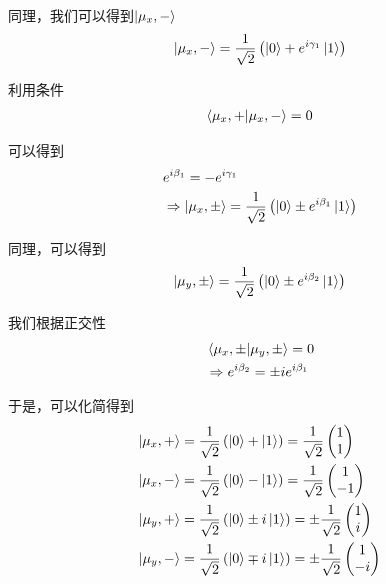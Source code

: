 \documentclass{article}
\begin{document}
同理，我们可以得到$\ket{\mu_x,-}$
\begin{align*}
    \ket{\mu_x,-}=\frac{1}{\sqrt{2}}\left(\ket{0}+e^{i\gamma_1}\ket{1}\right)
\end{align*}

利用条件
\begin{align*}
    \braket{\mu_x,+}{\mu_x,-}=0
\end{align*}

可以得到
\begin{align*}
    &e^{i\beta_1}=-e^{i\gamma_1}\\
    &\Rightarrow \ket{\mu_x,\pm}=\frac{1}{\sqrt{2}}\left(\ket{0}\pm e^{i\beta_1}\ket{1}\right)
\end{align*}

同理，可以得到
\begin{align*}
    \ket{\mu_y,\pm}=\frac{1}{\sqrt{2}}\left(\ket{0}\pm e^{i\beta_2}\ket{1}\right)
\end{align*}

我们根据正交性
\begin{align*}
    &\braket{\mu_x,\pm}{\mu_y,\pm}=0\\
    &\Rightarrow e^{i\beta_2}=\pm ie^{i\beta_1}
\end{align*}

于是，可以化简得到
\begin{align*}
    \ket{\mu_x,+}&=\frac{1}{\sqrt{2}}\left(\ket{0}+\ket{1}\right)=\frac{1}{\sqrt{2}}
    \begin{pmatrix}
        1\\
        1
    \end{pmatrix}\\
    \ket{\mu_x,-}&=\frac{1}{\sqrt{2}}\left(\ket{0}-\ket{1}\right)=\frac{1}{\sqrt{2}}
    \begin{pmatrix}
        1\\
        -1
    \end{pmatrix}\\
    \ket{\mu_y,+}&=\frac{1}{\sqrt{2}}\left(\ket{0}\pm i\ket{1}\right)=\pm\frac{1}{\sqrt{2}}
    \begin{pmatrix}
        1\\
        i
    \end{pmatrix}\\
    \ket{\mu_y,-}&=\frac{1}{\sqrt{2}}\left(\ket{0}\mp  i\ket{1}\right)=\pm\frac{1}{\sqrt{2}}
    \begin{pmatrix}
        1\\
        -i
    \end{pmatrix}\\
\end{align*}
\end{document}
